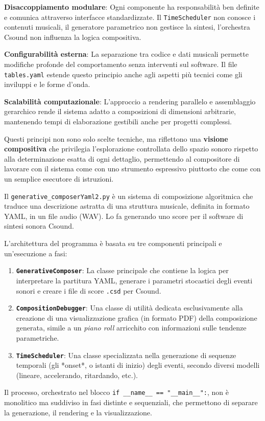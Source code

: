 \textbf{Disaccoppiamento modulare}: Ogni componente ha responsabilità ben definite e comunica attraverso interfacce standardizzate. Il \texttt{TimeScheduler} non conosce i contenuti musicali, il generatore parametrico non gestisce la sintesi, l'orchestra Csound non influenza la logica compositiva.

\textbf{Configurabilità esterna}: La separazione tra codice e dati musicali permette modifiche profonde del comportamento senza interventi sul software. Il file \texttt{tables.yaml} estende questo principio anche agli aspetti più tecnici come gli inviluppi e le forme d'onda.

\textbf{Scalabilità computazionale}: L'approccio a rendering parallelo e assemblaggio gerarchico rende il sistema adatto a composizioni di dimensioni arbitrarie, mantenendo tempi di elaborazione gestibili anche per progetti complessi.

Questi principi non sono solo scelte tecniche, ma riflettono una \textbf{visione compositiva} che privilegia l'esplorazione controllata dello spazio sonoro rispetto alla determinazione esatta di ogni dettaglio, permettendo al compositore di lavorare con il sistema come con uno strumento espressivo piuttosto che come con un semplice esecutore di istruzioni.


Il \texttt{generative\_composerYaml2.py} è un sistema di composizione algoritmica che traduce una descrizione astratta di una struttura musicale, definita in formato YAML, in un file audio (WAV). Lo fa generando uno score per il software di sintesi sonora Csound.

L'architettura del programma è basata su tre componenti principali e un'esecuzione a fasi:

\begin{enumerate}
    \item \textbf{\texttt{GenerativeComposer}}: La classe principale che contiene la logica per interpretare la partitura YAML, generare i parametri stocastici degli eventi sonori e creare i file di score \texttt{.csd} per Csound.
    \item \textbf{\texttt{CompositionDebugger}}: Una classe di utilità dedicata esclusivamente alla creazione di una visualizzazione grafica (in formato PDF) della composizione generata, simile a un \textit{piano roll} arricchito con informazioni sulle tendenze parametriche.
    \item \textbf{\texttt{TimeScheduler}}: Una classe specializzata nella generazione di sequenze temporali (gli *onset*, o istanti di inizio) degli eventi, secondo diversi modelli (lineare, accelerando, ritardando, etc.).
\end{enumerate}
Il processo, orchestrato nel blocco \texttt{if \_\_name\_\_ == "\_\_main\_\_":}, non è monolitico ma suddiviso in fasi distinte e sequenziali, che permettono di separare la generazione, il rendering e la visualizzazione.
